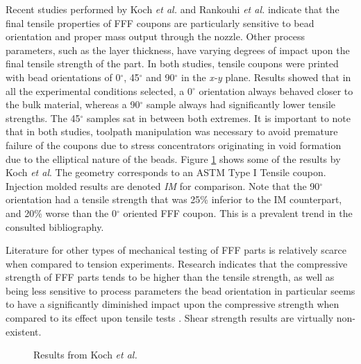\documentclass[main.tex]{subfiles}
\begin{document}
Recent studies performed by Koch \emph{et al.} \cite{Koch2017} and Rankouhi \emph{et al.} \cite{Rankouhi2016} indicate that the final tensile properties of FFF coupons are particularly sensitive to bead orientation and proper mass output through the nozzle. Other process parameters, such as the layer thickness, have varying degrees of impact upon the final tensile strength of the part. In both studies, tensile coupons were printed with bead orientations of 0$^\circ$, 45$^\circ$ and 90$^\circ$ in the \emph{x-y} plane. Results showed that in all the experimental conditions selected, a 0$^\circ$ orientation always behaved closer to the bulk material, whereas a 90$^\circ$ sample always had significantly lower tensile strengths. The 45$^\circ$ samples sat in between both extremes. It is important to note that in both studies, toolpath manipulation was necessary to avoid premature failure of the coupons due to stress concentrators originating in void formation due to the elliptical nature of the beads. Figure \ref{fig:FFFmechProp} shows some of the results by Koch \emph{et al}. The geometry corresponds to an ASTM Type I Tensile coupon. Injection molded results are denoted \emph{IM} for comparison. Note that the 90$^\circ$ orientation had a tensile strength that was 25\% inferior to the IM counterpart, and 20\% worse than the 0$^\circ$ oriented FFF coupon. This is a prevalent trend in the consulted bibliography.

Literature for other types of mechanical testing of FFF parts is relatively scarce when compared to tension experiments. Research indicates that the compressive strength of FFF parts tends to be higher than the tensile strength, as well as being less sensitive to process parameters \textemdash the bead orientation in particular seems to have a significantly diminished impact upon the compressive strength when compared to its effect upon tensile tests \cite{Ahn2002,Lee2007}. Shear strength results are virtually non-existent.

\pagebreak
\begin{figure}[h]
	\center
	\hfill
	\caption{Results from Koch \emph{et al.} \cite{Koch2017}} \label{fig:FFFmechProp}
\end{figure}
\end{document}
